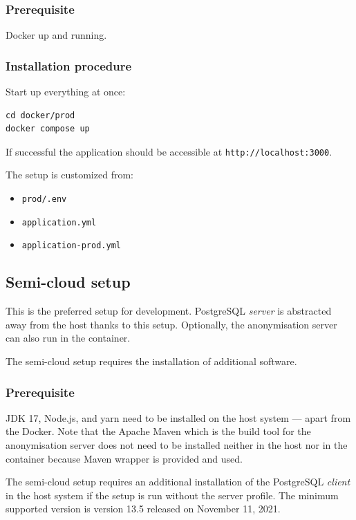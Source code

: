\documentclass[a4paper,twoside,12pt]{book}
\begin{document}
\subsubsection{Prerequisite}

Docker up and running.

\subsubsection{Installation procedure}

Start up everything at once:

\begin{verbatim}
cd docker/prod
docker compose up
\end{verbatim}

If successful the application should be accessible at \verb|http://localhost:3000|.

The setup is customized from:
\begin{itemize}
\item \verb|prod/.env|
\item \verb|application.yml|
\item \verb|application-prod.yml|
\end{itemize}


\subsection{Semi-cloud setup}

This is the preferred setup for development. PostgreSQL \textit{server} is abstracted away from the host thanks to this setup. Optionally, the anonymisation server can also run in the container.

The semi-cloud setup requires the installation of additional software.

\subsubsection{Prerequisite}

JDK 17, Node.js, and yarn need to be installed on the host system — apart from the Docker. Note that the Apache Maven which is the build tool for the anonymisation server does not need to be installed neither in the host nor in the container because Maven wrapper is provided and used.

The semi-cloud setup requires an additional installation of the PostgreSQL \textit{client} in the host system if the setup is run without the server profile. The minimum supported version is version 13.5 released on November 11, 2021.
\end{document}
